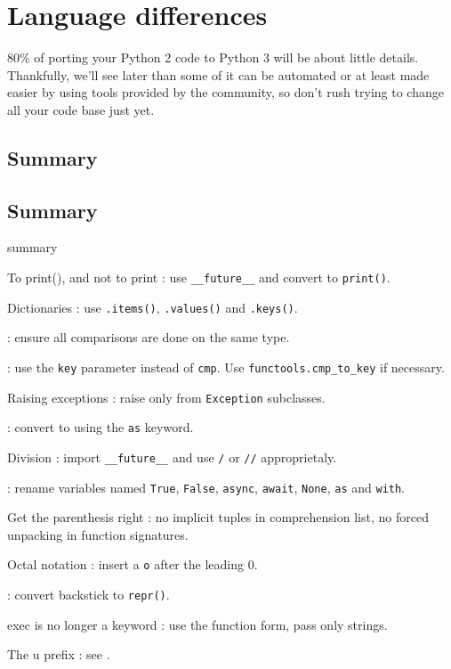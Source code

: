 
\chapter{Language differences}

80\% of porting your Python 2 code to Python 3 will be about little details. Thankfully, we'll see later than some of it can be automated or at least made easier by using tools provided by the community, so don't rush trying to change all your code base just yet.


\section{Summary}

\section{Summary}

\begin{labeling}{summary}
\item [To print(), and not to print]: use \lstinline{__future__} and convert to \lstinline{print()}.
\item [Dictionaries]: use \lstinline{.items()}, \lstinline{.values()} and \lstinline{.keys()}.
\item [Comparison operators]: ensure all comparisons are done on the same type.
\item [Comparison functions]: use the \lstinline{key} parameter instead of \lstinline{cmp}. Use \lstinline{functools.cmp_to_key} if necessary.
\item [Raising exceptions]: raise only from \lstinline{Exception} subclasses.
\item [Catching exceptions]: convert to using the \lstinline{as} keyword.
\item [Division]: import \lstinline{__future__} and use \lstinline{/} or \lstinline{//} approprietaly.
\item [Reserved keywords and constants]: rename variables named \lstinline{True}, \lstinline{False}, \lstinline{async}, \lstinline{await}, \lstinline{None}, \lstinline{as} and \lstinline{with}.
\item [Get the parenthesis right]: no implicit tuples in comprehension list, no forced unpacking in function signatures.
\item [Octal notation]: insert a \lstinline{o} after the leading 0.
\item [repr()]: convert backstick to \lstinline{repr()}.
\item [exec is no longer a keyword]: use the function form, pass only strings.
\item [The u prefix]: see .
\end{labeling}

